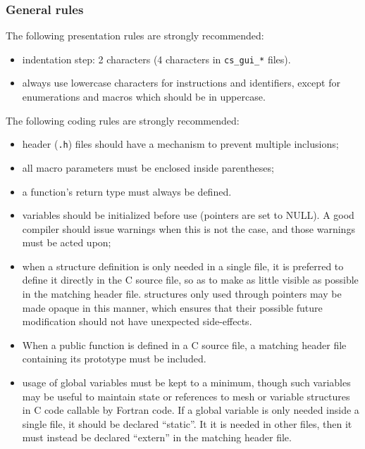 \subsubsection{General rules}

The following presentation rules are strongly recommended:
\begin{itemize}
\item indentation step: 2 characters (4 characters in \texttt{cs\_gui\_*}
      files).
\item always use lowercase characters for instructions and identifiers,
      except for enumerations and macros which should be in uppercase.
\end{itemize}

The following coding rules are strongly recommended:

\begin{itemize}

\item header (\texttt{.h}) files should have a mechanism to prevent
  multiple inclusions;

\item all macro parameters must be enclosed inside parentheses;

\item a function's return type must always be defined.

\item variables should be initialized before use
  (pointers are set to NULL). A good compiler should issue warnings when
  this is not the case, and those warnings must be acted upon;

\item when a structure definition is only needed in a single file,
  it is preferred to define it directly in the C source file,
  so as to make as little visible as possible in the matching header file.
  structures only used through pointers may be made opaque in this
  manner, which ensures that their possible future modification should
  not have unexpected side-effects.

\item When a public function is defined in a C source file, a matching
  header file containing its prototype must be included.

\item usage of global variables must be kept to a minimum, though such
  variables may be useful to maintain state or references to mesh or
  variable structures in C code callable by Fortran code.
  If a global variable is only needed inside a single file, it should
  be declared ``static''. It it is needed in other files, then it must
  instead  be declared ``extern'' in the matching header file.


\end{itemize}
